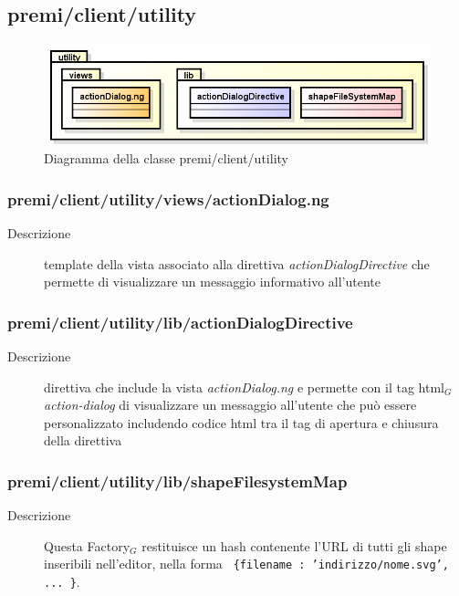 \clearpage
\subsection{premi/client/utility}
\begin{figure}[H]
\begin{center}
\includegraphics[scale=0.70]{img/diapkg/utility.png}
\caption{Diagramma della classe premi/client/utility}
\end{center}
\end{figure}

\subsubsection{premi/client/utility/views/actionDialog.ng}

\begin{description}
\item[Descrizione] \hfill
	template della vista associato alla direttiva \textit{actionDialogDirective} che permette di visualizzare un messaggio informativo all'utente	
\end{description}

\subsubsection{premi/client/utility/lib/actionDialogDirective}

\begin{description}
\item[Descrizione] \hfill
	direttiva che include la vista \textit{actionDialog.ng} e permette con il tag html$_G$ \textit{action-dialog} di visualizzare un messaggio all'utente che può essere personalizzato includendo codice html tra il tag di apertura e chiusura della direttiva
\end{description}

\subsubsection{premi/client/utility/lib/shapeFilesystemMap}

\begin{description}
\item[Descrizione] \hfill
	Questa Factory$_G$ restituisce un hash contenente l'URL di tutti gli shape inseribili nell'editor, nella forma \texttt{ \{filename : 'indirizzo/nome.svg', ... \}}.
\end{description}